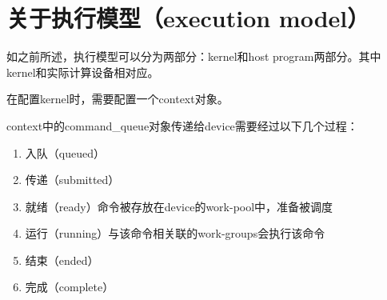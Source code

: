 \documentclass{ctexart}
\begin{document}
\section{关于执行模型（execution model）}
如之前所述，执行模型可以分为两部分：kernel和host program两部分。其中kernel和实际计算设备相对应。

在配置kernel时，需要配置一个context对象。

context中的command\_queue对象传递给device需要经过以下几个过程：
\begin{enumerate}
  \item 入队（queued）
  \item 传递（submitted）
  \item 就绪（ready）命令被存放在device的work-pool中，准备被调度
  \item 运行（running）与该命令相关联的work-groups会执行该命令
  \item 结束（ended）
  \item 完成（complete）
\end{enumerate}
\end{document}
